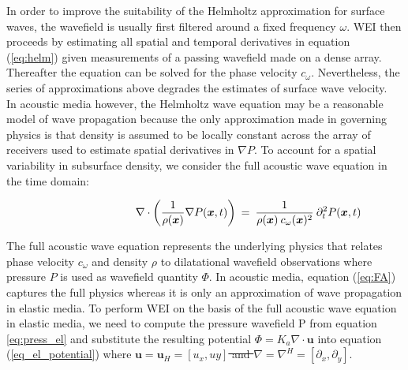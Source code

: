\documentclass{article} %
\providecommand{\DIFaddtex}[1]{{\protect\color{blue}\uwave{#1}}} %
\providecommand{\DIFdeltex}[1]{{\protect\color{red}\sout{#1}}}                      %
\providecommand{\DIFaddbegin}{} %
\providecommand{\DIFaddend}{} %
\providecommand{\DIFdelbegin}{} %
\providecommand{\DIFdelend}{} %
\providecommand{\DIFadd}[1]{\texorpdfstring{\DIFaddtex{#1}}{#1}} %
\providecommand{\DIFdel}[1]{\texorpdfstring{\DIFdeltex{#1}}{}} %
\newcommand{\DIFscaledelfig}{0.5}
\newlength{\DIFdelgraphicswidth} %
\newlength{\DIFdelgraphicsheight} %
\newcommand{\DIFaddincludegraphics}[2][]{{\color{blue}\fbox{\DIFOincludegraphics[#1]{#2}}}} %
\newcommand{\DIFdelincludegraphics}[2][]{%
\sbox{\DIFdelgraphicsbox}{\DIFOincludegraphics[#1]{#2}}%
\settoboxwidth{\DIFdelgraphicswidth}{\DIFdelgraphicsbox} %
\settoboxtotalheight{\DIFdelgraphicsheight}{\DIFdelgraphicsbox} %
\scalebox{\DIFscaledelfig}{%
\parbox[b]{\DIFdelgraphicswidth}{\usebox{\DIFdelgraphicsbox}\\[-\baselineskip] \rule{\DIFdelgraphicswidth}{0em}}\llap{\resizebox{\DIFdelgraphicswidth}{\DIFdelgraphicsheight}{%
\setlength{\unitlength}{\DIFdelgraphicswidth}%
\begin{picture}(1,1)%
\thicklines\linethickness{2pt} %
{\color[rgb]{1,0,0}\put(0,0){\framebox(1,1){}}}%
{\color[rgb]{1,0,0}\put(0,0){\line( 1,1){1}}}%
{\color[rgb]{1,0,0}\put(0,1){\line(1,-1){1}}}%
\end{picture}%
}\hspace*{3pt}}} %
} %
\DeclareRobustCommand{\DIFaddbegin}{\DIFOaddbegin \let\includegraphics\DIFaddincludegraphics} %
\DeclareRobustCommand{\DIFaddend}{\DIFOaddend \let\includegraphics\DIFOincludegraphics} %
\DeclareRobustCommand{\DIFdelbegin}{\DIFOdelbegin \let\includegraphics\DIFdelincludegraphics} %
\DeclareRobustCommand{\DIFdelend}{\DIFOaddend \let\includegraphics\DIFOincludegraphics} %
\begin{document}
	In order to improve the suitability of the Helmholtz approximation for surface waves, the wavefield is usually first filtered around a fixed frequency $\omega$. WEI then proceeds by estimating all spatial and temporal derivatives in equation (\ref{eq:helm}) given measurements of a passing wavefield made on a dense array. Thereafter the equation can be solved for the phase velocity $c_{\omega}$. Nevertheless, the series of approximations above degrades the estimates of surface wave velocity.\\ 

	In acoustic media however, the Helmholtz wave equation may be a reasonable model of wave propagation because the only approximation made in governing physics is that density is assumed to be locally constant across the array of receivers used to estimate spatial derivatives in $\nabla P$. To account for a spatial variability in subsurface density, we consider the full acoustic wave equation in the time domain:

	\begin{align}\label{eq:FA}
		\shoveright \shoveright \shoveright \shoveright \shoveright \shoveright \shoveright \shoveright %
		\; \; \; \nabla \cdot \bigg( \frac{1}{\rho(\bm{x})} \nabla P(\bm{x},t) \bigg) &\: = \: \frac{1}{\rho(\bm{x}) \: c_{\omega}(\bm{x})^{2}} \: \partial_{t}^{2} P(\bm{x},t)
	\end{align}

	The full acoustic wave equation represents the underlying physics that relates phase velocity $c_{\omega}$ and density $\rho$ to dilatational wavefield observations where pressure $P$ is used as wavefield quantity $\Phi$. In acoustic media, equation (\ref{eq:FA}) captures the full physics whereas it is only an approximation of wave propagation in elastic media. To perform WEI on the basis of the full acoustic wave equation in elastic media, we need to compute the pressure wavefield P from equation \eqref{eq:press_el} and substitute the resulting potential $\Phi = K_{a} \nabla \cdot \bm{u}$ into equation (\ref{eq_el_potential}) where \DIFdelbegin \DIFdel{$\bm{u} = \bm{u}_{H} = [u_{x}, u{y}]$ and $\nabla = \nabla^{H} = [\partial_{x}, \partial_{y}]$}\DIFdelend \DIFaddbegin \DIFadd{$\bm{u} = \bm{u}_{H}$ and $\nabla = \nabla_{H}$}\DIFaddend .\\
\end{document}
